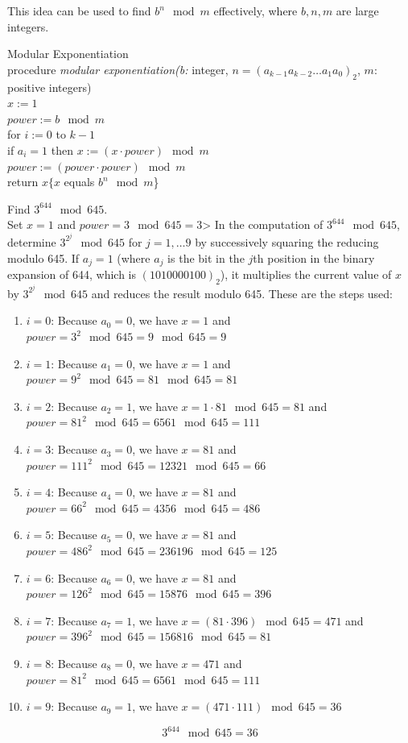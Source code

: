 \documentclass[12pt]{article}
\begin{document}
This idea can be used to find $b^n \mod m$ effectively, where $b, n, m$ are large integers. 
\begin{alg} Modular Exponentiation \\ procedure \textit{modular exponentiation(b:} integer, $n = (a_{k - 1}a_{k - 2}\dots a_1a_0)_2$, $m$: positive integers) \\ $x := 1$ \\ $ power := b \mod m$ \\ for $i := 0$ to $k - 1$ \\ \indent if $a_i = 1$ then $x := (x \cdot power) \mod m$ \\ \indent $power := (power \cdot power) \mod m$ \\ return $x \{x$ equals $b^n \mod m$\} \end{alg} 
\begin{example} Find $3^{644} \mod 645$. \\ Set $x = 1$ and $power = 3 \mod 645 = 3$> In the computation of $3^{644} \mod 645$, determine $3^{2^j} \mod 645$ for $j = 1, \dots 9 $ by successively squaring the reducing modulo 645. If $a_j = 1$ (where $a_j$ is the bit in the $j$th position in the binary expansion of 644, which is $(1010000100)_2$), it multiplies the current value of $x$ by $3^{2^j} \mod 645$ and reduces the result modulo 645. These are the steps used: \begin{enumerate} 
\item $i = 0$: Because $a_0 = 0$, we have $x = 1$ and $power = 3^2 \mod 645 = 9 \mod 645 = 9$  
\item $i = 1$: Because $a_1 = 0$, we have $x = 1$ and $power = 9^2 \mod 645 = 81 \mod 645 = 81$
\item $i = 2$: Because $a_2 = 1$, we have $x = 1 \cdot 81 \mod 645 = 81$ and $power = 81^2 \mod 645 = 6561 \mod 645 = 111$ 
\item $i = 3$: Because $a_3 = 0$, we have $x = 81$ and $power = 111^2 \mod 645 = 12321 \mod 645 = 66$ 
\item $i = 4$: Because $a_4 = 0$, we have $x = 81$ and $power = 66^2 \mod 645 = 4356 \mod 645 = 486$ 
\item $i = 5$: Because $a_5 = 0$, we have $x = 81$ and $power = 486^2 \mod 645 = 236196 \mod 645 = 125$ 
\item $i = 6$: Because $a_6 = 0$, we have $x = 81$ and $power = 126^2 \mod 645 = 15876 \mod 645 = 396$ 
\item $i = 7$: Because $a_7 = 1$, we have $x = (81 \cdot 396) \mod 645 = 471$ and $power = 396^2 \mod 645 = 156816 \mod 645 = 81$
\item $i = 8$: Because $a_8 = 0$, we have $x = 471$ and $power = 81^2 \mod 645 = 6561 \mod 645 = 111$ 
\item $i = 9$: Because $a_9 = 1$, we have $x = (471 \cdot 111) \mod 645 = 36$ \end{enumerate} $$ 3^{644} \mod 645 = 36$$ \end{example} 
\end{document}
